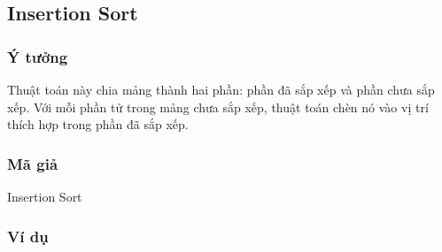 \subsection{Insertion Sort}


\subsubsection{Ý tưởng}

Thuật toán này chia mảng thành hai phần: phần đã sắp xếp và 
phần chưa sắp xếp. Với mỗi phần tử trong mảng chưa sắp xếp, thuật toán chèn nó vào vị trí thích hợp trong phần đã sắp xếp. \cite[p.~90]{hoang2008}

\subsubsection{Mã giả}

\begin{algorithm}[H]
	\caption{Insertion Sort \cite{code-insertion}}
\end{algorithm}

\subsubsection{Ví dụ}

